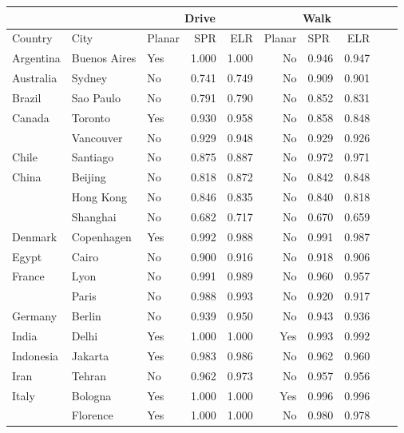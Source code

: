 \begin{tabular}{ l l l r r r l r r r }
\toprule
             &               & \multicolumn{3}{|c|}{Drive}         & \multicolumn{3}{c}{Walk}            \\
\midrule
Country      & City          &  Planar  &  SPR   &  ELR   &  Planar  &  SPR   &  ELR   \\
\midrule
Argentina & Buenos Aires &      Yes &  1.000 &  1.000 &       No &  0.946 &  0.947 \\
Australia & Sydney &       No &  0.741 &  0.749 &       No &  0.909 &  0.901 \\
Brazil & Sao Paulo &       No &  0.791 &  0.790 &       No &  0.852 &  0.831 \\
Canada & Toronto &      Yes &  0.930 &  0.958 &       No &  0.858 &  0.848 \\
          & Vancouver &       No &  0.929 &  0.948 &       No &  0.929 &  0.926 \\
Chile & Santiago &       No &  0.875 &  0.887 &       No &  0.972 &  0.971 \\
China & Beijing &       No &  0.818 &  0.872 &       No &  0.842 &  0.848 \\
          & Hong Kong &       No &  0.846 &  0.835 &       No &  0.840 &  0.818 \\
          & Shanghai &       No &  0.682 &  0.717 &       No &  0.670 &  0.659 \\
Denmark & Copenhagen &      Yes &  0.992 &  0.988 &       No &  0.991 &  0.987 \\
Egypt & Cairo &       No &  0.900 &  0.916 &       No &  0.918 &  0.906 \\
France & Lyon &       No &  0.991 &  0.989 &       No &  0.960 &  0.957 \\
          & Paris &       No &  0.988 &  0.993 &       No &  0.920 &  0.917 \\
Germany & Berlin &       No &  0.939 &  0.950 &       No &  0.943 &  0.936 \\
India & Delhi &      Yes &  1.000 &  1.000 &      Yes &  0.993 &  0.992 \\
Indonesia & Jakarta &      Yes &  0.983 &  0.986 &       No &  0.962 &  0.960 \\
Iran & Tehran &       No &  0.962 &  0.973 &       No &  0.957 &  0.956 \\
Italy & Bologna &      Yes &  1.000 &  1.000 &      Yes &  0.996 &  0.996 \\
          & Florence &      Yes &  1.000 &  1.000 &       No &  0.980 &  0.978 \\

\end{tabular}
